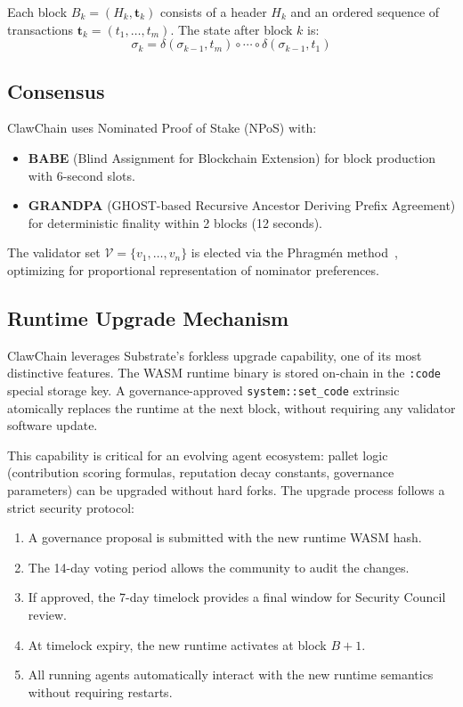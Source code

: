 \documentclass[conference]{IEEEtran}
\begin{document}
Each block $B_k = (H_k, \mathbf{t}_k)$ consists of a header $H_k$ and an ordered sequence of transactions $\mathbf{t}_k = (t_1, \ldots, t_m)$. The state after block $k$ is:
\begin{equation}
    \sigma_k = \delta(\sigma_{k-1}, t_m) \circ \cdots \circ \delta(\sigma_{k-1}, t_1)
\end{equation}

\subsection{Consensus}

ClawChain uses Nominated Proof of Stake (NPoS) with:
\begin{itemize}
    \item \textbf{BABE} (Blind Assignment for Blockchain Extension) for block production with 6-second slots.
    \item \textbf{GRANDPA} (GHOST-based Recursive Ancestor Deriving Prefix Agreement) for deterministic finality within 2 blocks (12 seconds).
\end{itemize}

The validator set $\mathcal{V} = \{v_1, \ldots, v_n\}$ is elected via the Phragm\'{e}n method~\cite{brill2017phragmen}, optimizing for proportional representation of nominator preferences.

\subsection{Runtime Upgrade Mechanism}

ClawChain leverages Substrate's forkless upgrade capability, one of its most distinctive features. The WASM runtime binary is stored on-chain in the \texttt{:code} special storage key. A governance-approved \texttt{system::set\_code} extrinsic atomically replaces the runtime at the next block, without requiring any validator software update.

This capability is critical for an evolving agent ecosystem: pallet logic (contribution scoring formulas, reputation decay constants, governance parameters) can be upgraded without hard forks. The upgrade process follows a strict security protocol:

\begin{enumerate}
    \item A governance proposal is submitted with the new runtime WASM hash.
    \item The 14-day voting period allows the community to audit the changes.
    \item If approved, the 7-day timelock provides a final window for Security Council review.
    \item At timelock expiry, the new runtime activates at block $B + 1$.
    \item All running agents automatically interact with the new runtime semantics without requiring restarts.
\end{enumerate}
\end{document}
